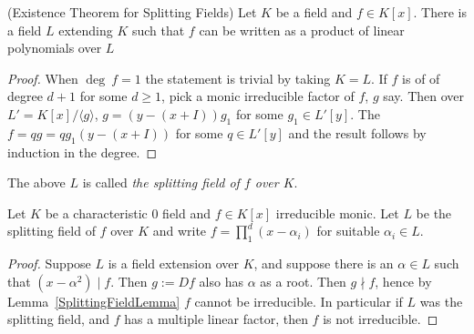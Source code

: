     \begin{theorem}\label{ExistenceTheoremForSplittingField}(Existence Theorem for Splitting Fields) 
        Let $K$ be a field and $f\in K[x]$. There is a field $L$ extending $K$ such that $f$ can be written as a product of linear polynomials over $L$
    \end{theorem}
    \begin{proof}
        When $\deg \ f = 1$ the statement is trivial by taking $K=L$. If $f$ is of of degree $d+1$ for some $d\geq 1$, pick a monic irreducible factor of $f$, $g$ say. Then over $L' = K[x]/\langle g\rangle$, $g =(y - (x+I))g_1 $ for some $g_1\in L'[y]$. The $f=qg=qg_1(y-(x+I))$ for some $q\in L'[y]$ and the result follows by induction in the degree.
    \end{proof}
    \begin{definition}
        The above $L$ is called \textit{the splitting field of $f$ over $K$}.
    \end{definition}
    \begin{lemma}
        Let $K$ be a characteristic $0$ field and $f\in K[x]$ irreducible monic. Let $L$ be the splitting field of $f$ over $K$ and write $f=\prod_1^d (x-\alpha_i)$ for suitable $\alpha_i\in L$. 
    \end{lemma}
    \begin{proof}
        Suppose $L$ is a field extension over $K$, and suppose there is an $\alpha \in L$ such that $(x-\alpha^2)\mid f$. Then $g:=D f$ also has $\alpha$ as a root. Then $g\nmid f$, hence by Lemma~\ref{SplittingFieldLemma} $f$ cannot be irreducible. In particular if $L$ was the splitting field, and $f$ has a multiple linear factor, then $f$ is not irreducible.  
    \end{proof}

